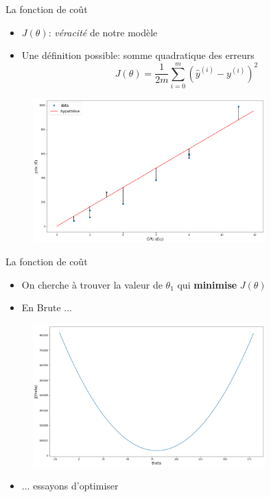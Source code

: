 \documentclass[11pt]{beamer}
\begin{document}
\begin{frame}{La fonction de coût}
  \begin{itemize}
  \item  $J(\theta)$: \textit{véracité} de notre modèle
  \item Une définition possible: somme quadratique des erreurs
      \begin{equation*}
        J(\theta) = \frac{1}{2m} \displaystyle\sum_{i=0}^{m}(\hat{y}^{(i)} - y^{(i)})^{2}
      \end{equation*}
  \end{itemize}
  \vspace{-0.5cm}
  \begin{figure}
    \includegraphics[width=0.8\textwidth]{figs/modelEstimation.png}
  \end{figure}  
\end{frame}

\begin{frame}{La fonction de coût}
  \begin{itemize}
  \item On cherche à trouver la valeur de $\theta_{1}$ qui \textbf{minimise} $J(\theta)$
    \vspace{0.2cm}
  \item En Brute ...
  \end{itemize}
  \vspace{-0.5cm}
  \begin{figure}
    \includegraphics[width=0.8\textwidth]{figs/costFct.png}
  \end{figure}
  \vspace{-0.5cm}
  \begin{itemize}
  \item ... essayons d'optimiser
  \end{itemize}
\end{frame}
\end{document}
